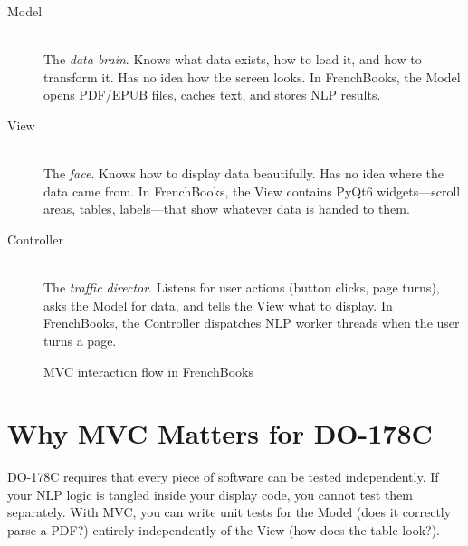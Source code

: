 \documentclass[12pt,oneside]{book}
\begin{document}
\begin{description}
  \item[Model] \hfill \\
    The \textit{data brain}. Knows what data exists, how to load it, and how to transform
    it. Has no idea how the screen looks. In FrenchBooks, the Model opens PDF/EPUB files,
    caches text, and stores NLP results.

  \item[View] \hfill \\
    The \textit{face}. Knows how to display data beautifully. Has no idea where the data
    came from. In FrenchBooks, the View contains PyQt6 widgets—scroll areas, tables,
    labels—that show whatever data is handed to them.

  \item[Controller] \hfill \\
    The \textit{traffic director}. Listens for user actions (button clicks, page turns),
    asks the Model for data, and tells the View what to display. In FrenchBooks, the
    Controller dispatches NLP worker threads when the user turns a page.
\end{description}

\begin{figure}[H]
\centering
\caption{MVC interaction flow in FrenchBooks}
\label{fig:mvc}
\end{figure}

\section{Why MVC Matters for DO-178C}

DO-178C requires that every piece of software can be tested independently. If your
NLP logic is tangled inside your display code, you cannot test them separately. With MVC,
you can write unit tests for the Model (does it correctly parse a PDF?) entirely
independently of the View (how does the table look?).
\end{document}
